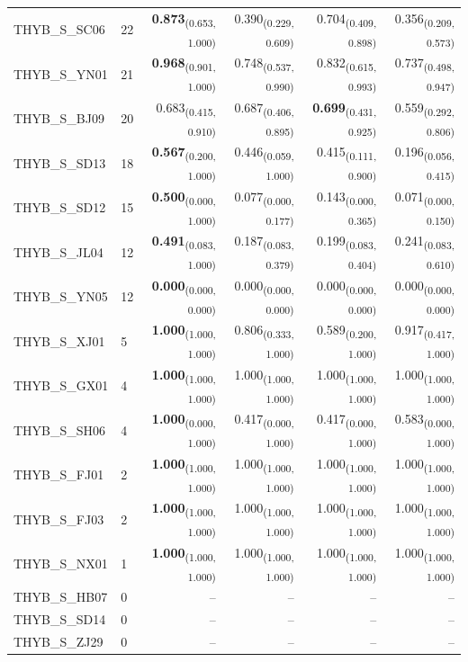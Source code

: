 \begin{table}[p]
\begin{tabular}{llrrrr}
THYB\_S\_SC06 & 22 & \textbf{0.873}\textsubscript{(0.653, 1.000)} & 0.390\textsubscript{(0.229, 0.609)} & 0.704\textsubscript{(0.409, 0.898)} & 0.356\textsubscript{(0.209, 0.573)} \\
THYB\_S\_YN01 & 21 & \textbf{0.968}\textsubscript{(0.901, 1.000)} & 0.748\textsubscript{(0.537, 0.990)} & 0.832\textsubscript{(0.615, 0.993)} & 0.737\textsubscript{(0.498, 0.947)} \\
THYB\_S\_BJ09 & 20 & 0.683\textsubscript{(0.415, 0.910)} & 0.687\textsubscript{(0.406, 0.895)} & \textbf{0.699}\textsubscript{(0.431, 0.925)} & 0.559\textsubscript{(0.292, 0.806)} \\
THYB\_S\_SD13 & 18 & \textbf{0.567}\textsubscript{(0.200, 1.000)} & 0.446\textsubscript{(0.059, 1.000)} & 0.415\textsubscript{(0.111, 0.900)} & 0.196\textsubscript{(0.056, 0.415)} \\
THYB\_S\_SD12 & 15 & \textbf{0.500}\textsubscript{(0.000, 1.000)} & 0.077\textsubscript{(0.000, 0.177)} & 0.143\textsubscript{(0.000, 0.365)} & 0.071\textsubscript{(0.000, 0.150)} \\
THYB\_S\_JL04 & 12 & \textbf{0.491}\textsubscript{(0.083, 1.000)} & 0.187\textsubscript{(0.083, 0.379)} & 0.199\textsubscript{(0.083, 0.404)} & 0.241\textsubscript{(0.083, 0.610)} \\
THYB\_S\_YN05 & 12 & \textbf{0.000}\textsubscript{(0.000, 0.000)} & 0.000\textsubscript{(0.000, 0.000)} & 0.000\textsubscript{(0.000, 0.000)} & 0.000\textsubscript{(0.000, 0.000)} \\
THYB\_S\_XJ01 & 5 & \textbf{1.000}\textsubscript{(1.000, 1.000)} & 0.806\textsubscript{(0.333, 1.000)} & 0.589\textsubscript{(0.200, 1.000)} & 0.917\textsubscript{(0.417, 1.000)} \\
THYB\_S\_GX01 & 4 & \textbf{1.000}\textsubscript{(1.000, 1.000)} & 1.000\textsubscript{(1.000, 1.000)} & 1.000\textsubscript{(1.000, 1.000)} & 1.000\textsubscript{(1.000, 1.000)} \\
THYB\_S\_SH06 & 4 & \textbf{1.000}\textsubscript{(0.000, 1.000)} & 0.417\textsubscript{(0.000, 1.000)} & 0.417\textsubscript{(0.000, 1.000)} & 0.583\textsubscript{(0.000, 1.000)} \\
THYB\_S\_FJ01 & 2 & \textbf{1.000}\textsubscript{(1.000, 1.000)} & 1.000\textsubscript{(1.000, 1.000)} & 1.000\textsubscript{(1.000, 1.000)} & 1.000\textsubscript{(1.000, 1.000)} \\
THYB\_S\_FJ03 & 2 & \textbf{1.000}\textsubscript{(1.000, 1.000)} & 1.000\textsubscript{(1.000, 1.000)} & 1.000\textsubscript{(1.000, 1.000)} & 1.000\textsubscript{(1.000, 1.000)} \\
THYB\_S\_NX01 & 1 & \textbf{1.000}\textsubscript{(1.000, 1.000)} & 1.000\textsubscript{(1.000, 1.000)} & 1.000\textsubscript{(1.000, 1.000)} & 1.000\textsubscript{(1.000, 1.000)} \\
THYB\_S\_HB07 & 0 & -- & -- & -- & -- \\
THYB\_S\_SD14 & 0 & -- & -- & -- & -- \\
THYB\_S\_ZJ29 & 0 & -- & -- & -- & -- \\
\bottomrule
\end{tabular}
\end{table}
\clearpage
